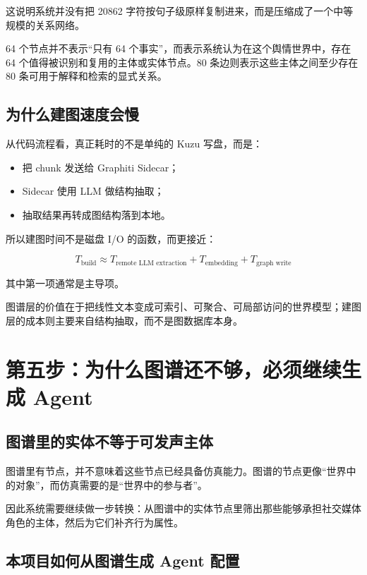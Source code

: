 \documentclass[UTF8,10pt,oneside]{ctexbook}
\begin{document}
这说明系统并没有把 20862 字符按句子级原样复制进来，而是压缩成了一个中等规模的关系网络。

\begin{casebox}[本次案例中的图谱意义]
64 个节点并不表示“只有 64 个事实”，而表示系统认为在这个舆情世界中，存在 64 个值得被识别和复用的主体或实体节点。80 条边则表示这些主体之间至少存在 80 条可用于解释和检索的显式关系。
\end{casebox}

\section{为什么建图速度会慢}

从代码流程看，真正耗时的不是单纯的 Kuzu 写盘，而是：

\begin{itemize}
  \item 把 chunk 发送给 Graphiti Sidecar；
  \item Sidecar 使用 LLM 做结构抽取；
  \item 抽取结果再转成图结构落到本地。
\end{itemize}

所以建图时间不是磁盘 I/O 的函数，而更接近：

\[
T_{\text{build}} \approx T_{\text{remote LLM extraction}} + T_{\text{embedding}} + T_{\text{graph write}}
\]

其中第一项通常是主导项。

\begin{takeawaybox}[本章核心结论]
图谱层的价值在于把线性文本变成可索引、可聚合、可局部访问的世界模型；建图层的成本则主要来自结构抽取，而不是图数据库本身。
\end{takeawaybox}

\chapter{第五步：为什么图谱还不够，必须继续生成 Agent}

\section{图谱里的实体不等于可发声主体}

图谱里有节点，并不意味着这些节点已经具备仿真能力。图谱的节点更像“世界中的对象”，而仿真需要的是“世界中的参与者”。

因此系统需要继续做一步转换：从图谱中的实体节点里筛出那些能够承担社交媒体角色的主体，然后为它们补齐行为属性。

\section{本项目如何从图谱生成 Agent 配置}
\end{document}
